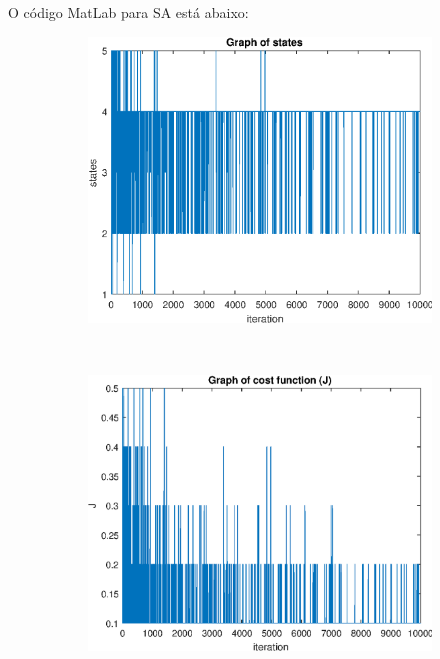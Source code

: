 \documentclass[12pt]{article}
\newenvironment{exercise}[2][Exercício]{\begin{trivlist}
\item[\hskip \labelsep {\bfseries #1}\hskip \labelsep {\bfseries #2.}]}{\end{trivlist}}
\begin{document}
\begin{exercise}{2.e}
O código MatLab para SA está abaixo:


\begin{figure}[H]
    \centering
    \begin{subfigure}[b]{0.45\textwidth}
        \includegraphics[width=\textwidth]{figs/ex2e_states.eps}
    \end{subfigure}
    ~ 
    \begin{subfigure}[b]{0.45\textwidth}
        \includegraphics[width=\textwidth]{figs/ex2e_j.eps}
    \end{subfigure}
\end{figure}


\end{exercise}
\end{document}
